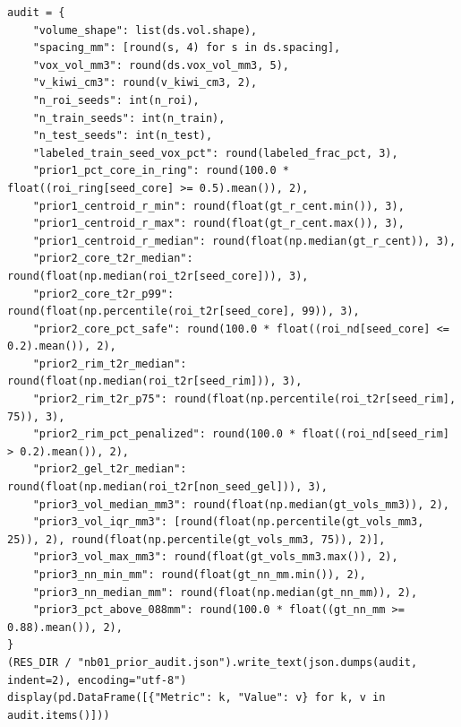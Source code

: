 \documentclass[10pt,a4paper]{article}
\renewcommand{\_}{\origunderscore\allowbreak}
\begin{document}
\begin{codebox}
\begin{lstlisting}[style=pybmed]
audit = {
    "volume_shape": list(ds.vol.shape),
    "spacing_mm": [round(s, 4) for s in ds.spacing],
    "vox_vol_mm3": round(ds.vox_vol_mm3, 5),
    "v_kiwi_cm3": round(v_kiwi_cm3, 2),
    "n_roi_seeds": int(n_roi),
    "n_train_seeds": int(n_train),
    "n_test_seeds": int(n_test),
    "labeled_train_seed_vox_pct": round(labeled_frac_pct, 3),
    "prior1_pct_core_in_ring": round(100.0 * float((roi_ring[seed_core] >= 0.5).mean()), 2),
    "prior1_centroid_r_min": round(float(gt_r_cent.min()), 3),
    "prior1_centroid_r_max": round(float(gt_r_cent.max()), 3),
    "prior1_centroid_r_median": round(float(np.median(gt_r_cent)), 3),
    "prior2_core_t2r_median": round(float(np.median(roi_t2r[seed_core])), 3),
    "prior2_core_t2r_p99": round(float(np.percentile(roi_t2r[seed_core], 99)), 3),
    "prior2_core_pct_safe": round(100.0 * float((roi_nd[seed_core] <= 0.2).mean()), 2),
    "prior2_rim_t2r_median": round(float(np.median(roi_t2r[seed_rim])), 3),
    "prior2_rim_t2r_p75": round(float(np.percentile(roi_t2r[seed_rim], 75)), 3),
    "prior2_rim_pct_penalized": round(100.0 * float((roi_nd[seed_rim] > 0.2).mean()), 2),
    "prior2_gel_t2r_median": round(float(np.median(roi_t2r[non_seed_gel])), 3),
    "prior3_vol_median_mm3": round(float(np.median(gt_vols_mm3)), 2),
    "prior3_vol_iqr_mm3": [round(float(np.percentile(gt_vols_mm3, 25)), 2), round(float(np.percentile(gt_vols_mm3, 75)), 2)],
    "prior3_vol_max_mm3": round(float(gt_vols_mm3.max()), 2),
    "prior3_nn_min_mm": round(float(gt_nn_mm.min()), 2),
    "prior3_nn_median_mm": round(float(np.median(gt_nn_mm)), 2),
    "prior3_pct_above_088mm": round(100.0 * float((gt_nn_mm >= 0.88).mean()), 2),
}
(RES_DIR / "nb01_prior_audit.json").write_text(json.dumps(audit, indent=2), encoding="utf-8")
display(pd.DataFrame([{"Metric": k, "Value": v} for k, v in audit.items()]))
\end{lstlisting}
\end{codebox}
\end{document}
